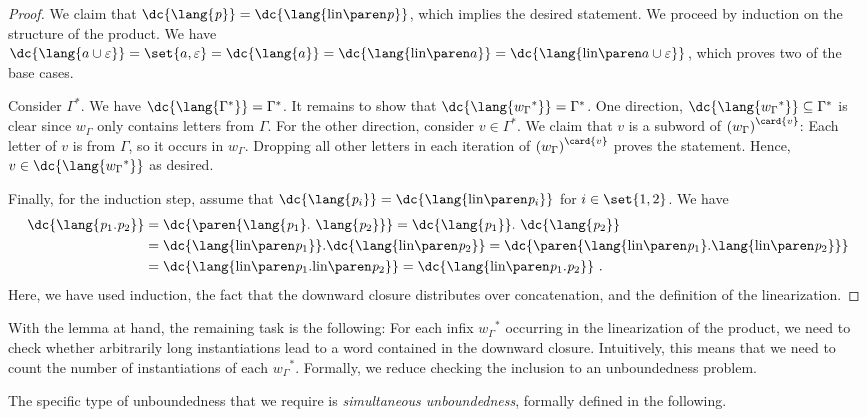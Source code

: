 \documentclass[../../diss.tex]{subfiles}
\begin{document}
\begin{proof}
    We claim that $\dc{\lang{\product}} = \dc{\lang{\linof{\product}}}$, which implies the desired statement.
    We proceed by induction on the structure of the product.
    We have $\dc{\lang{a \cup \eps}} = \set{a,\eps} = \dc{\lang{a}} = \dc{\lang{\linof{a}}} = \dc{\lang{\linof{a \cup \eps}}}$, which proves two of the base cases.

    Consider $\Gamma^*$.
    We have $\dc{\lang{\Gamma^*}} = \Gamma^*$.
    It remains to show that $\dc{\lang{{w_\Gamma}^*}} = \Gamma^*$.
    One direction, $\dc{\lang{{w_\Gamma}^*}} \subseteq \Gamma^*$ is clear since $w_\Gamma$ only contains letters from $\Gamma$.
    For the other direction, consider $v \in \Gamma^*$.
    We claim that $v$ is a subword of ${(w_\Gamma)}^{\card{v}}$: Each letter of $v$ is from $\Gamma$, so it occurs in $w_\Gamma$.
    Dropping all other letters in each iteration of ${(w_\Gamma)}^{\card{v}}$ proves the statement.
    Hence, $v \in \dc{\lang{{w_\Gamma}^*}}$ as desired.

    Finally, for the induction step, assume that $\dc{\lang{\product_i}} = \dc{\lang{\linof{\product_i}}}$ for $i \in \set{1,2}$.
    We have
    \begin{align*}
    \dc{\lang{\product_1.\product_2}}
    &= \dc{\paren{\lang{\product_1}.\ \lang{\product_2}}}
    = \dc{\lang{\product_1}}.\ \dc{\lang{\product_2}}
    \\
    &= \dc{\lang{\linof{\product_1}}}.\dc{\lang{\linof{\product_2}}}
    = \dc{\paren{\lang{\linof{\product_1}}.\lang{\linof{\product_2}}}}
    \\
    &= \dc{\lang{\linof{\product_1}.\linof{\product_2}}}
    = \dc{\lang{\linof{\product_1.\product_2}}}
    \ .
    \end{align*}
    Here, we have used induction, the fact that the downward closure distributes over concatenation, and the definition of the linearization.
\end{proof}

With the lemma at hand, the remaining task is the following:
For each infix ${w_\Gamma}^*$ occurring in the linearization of the product, we need to check whether arbitrarily long instantiations lead to a word contained in the downward closure.
Intuitively, this means that we need to count the number of instantiations of each ${w_\Gamma}^*$.
Formally, we reduce checking the inclusion to an unboundedness problem.

The specific type of unboundedness that we require is \emph{simultaneous unboundedness}, formally defined in the following.
\end{document}
